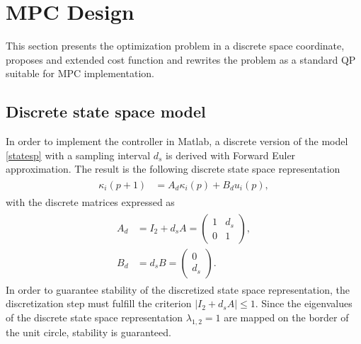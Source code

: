 \documentclass[letterpaper,10pt,conference]{ieeeconf}
\begin{document}
\section{MPC Design} \label{sec:MPC}
This section presents the optimization problem in a discrete space coordinate, proposes and extended cost function and rewrites the problem as a standard QP suitable for MPC implementation.
\subsection{Discrete state space model}
In order to implement the controller in Matlab, a discrete version of the model \eqref{statesp} with a sampling interval $d_s$ is derived with Forward Euler approximation. The result is the following discrete state space representation
\begin{align}
\label{eq:model}
\begin{split}
\kappa_i(p+1) &= A_d \kappa_i(p) + B_d u_i(p),
\end{split}
\end{align}
with the discrete matrices expressed as
\begin{align}
\label{eq:model2}
\begin{split}
    A_d &= I_2 + d_sA = \begin{pmatrix}
        1&d_s\\
        0&1
    \end{pmatrix},\\
B_d &= d_sB = \begin{pmatrix}
    0\\
    d_s
\end{pmatrix}.
\end{split}
\end{align}
In order to guarantee stability of the discretized state space representation, the discretization step must fulfill the criterion
$ |I_2 + d_s A| \leq 1$.
Since the eigenvalues of the discrete state space representation $\lambda_{1,2}=1$ are mapped on the border of the unit circle, stability is guaranteed.
\end{document}
